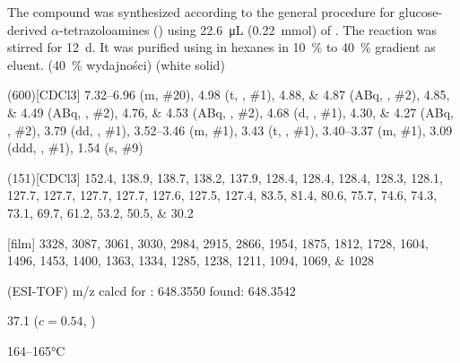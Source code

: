 The compound was synthesized according to the general procedure for glucose-derived $\alpha$-tetrazoloamines () using \SI{22.6}{\micro\liter} (\SI{0.22}{\milli\mol}) of .
The reaction was stirred for \SI{12}{\day}.
It was purified using  in hexanes in \SI{10}{\percent} to \SI{40}{\percent} gradient as eluent.
(\SI{40}{\percent} wydajności) (white solid)
\begin{fullexp}
	\NMR(600)[CDCl3] \numrange{7.32}{6.96} (m, \#{20}), \num{4.98} (t, , \#{1}), \numlist{4.88;4.87} (ABq, , \#{2}), \numlist{4.85;4.49} (ABq, , \#{2}), \numlist{4.76;4.53} (ABq, , \#{2}), \num{4.68} (d, , \#{1}), \numlist{4.30;4.27} (ABq, , \#{2}), \num{3.79} (dd, , \#{1}), \numrange{3.52}{3.46} (m, \#{1}), \num{3.43} (t, , \#{1}), \numrange{3.40}{3.37} (m, \#{1}), \num{3.09} (ddd, , \#{1}), \num{1.54} (s, \#{9})\par\noindent
	(151)[CDCl3] \numlist{152.4; 138.9; 138.7; 138.2; 137.9; 128.4; 128.4; 128.4; 128.3; 128.1; 127.7; 127.7; 127.7; 127.7; 127.6; 127.5; 127.4; 83.5; 81.4; 80.6; 75.7; 74.6; 74.3; 73.1; 69.7; 61.2; 53.2; 50.5; 30.2}\par\noindent
	[film] \numlist{3328; 3087; 3061; 3030; 2984; 2915; 2866; 1954; 1875; 1812; 1728; 1604; 1496; 1453; 1400; 1363; 1334; 1285; 1238; 1211; 1094; 1069; 1028}\par\noindent
	 (ESI-TOF) m/z calcd for : \num{648.3550} found: \num{648.3542}\par\noindent
	\data{[$\alpha^{23}_D$]~$=$} \num{37.1} ($c = 0.54$, )\par\noindent
	 \numrange{164}{165}\si{\celsius}
\end{fullexp}

